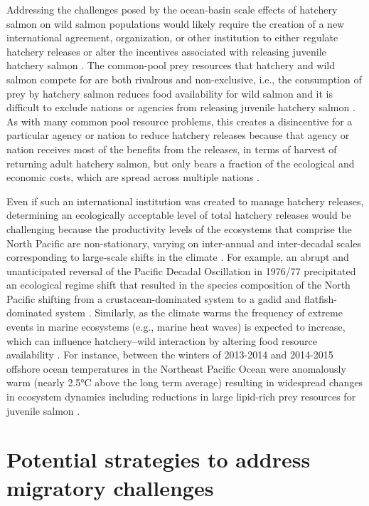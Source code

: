 Addressing the challenges posed by the ocean-basin scale effects of
hatchery salmon on wild salmon populations would likely require the
creation of a new international agreement, organization, or other
institution to either regulate hatchery releases or alter the incentives
associated with releasing juvenile hatchery salmon \citep{Holt2008b}.
The common-pool prey resources that hatchery and wild salmon compete for
are both rivalrous and non-exclusive, i.e., the consumption of prey by
hatchery salmon reduces food availability for wild salmon and it is
difficult to exclude nations or agencies from releasing juvenile
hatchery salmon \citep{Hardin1968a}. As with many common pool resource
problems, this creates a disincentive for a particular agency or nation
to reduce hatchery releases because that agency or nation receives most
of the benefits from the releases, in terms of harvest of returning
adult hatchery salmon, but only bears a fraction of the ecological and
economic costs, which are spread across multiple nations
\citep{Holt2008b}.

Even if such an international institution was created to manage hatchery
releases, determining an ecologically acceptable level of total hatchery
releases would be challenging because the productivity levels of the
ecosystems that comprise the North Pacific are non-stationary, varying
on inter-annual and inter-decadal scales corresponding to large-scale
shifts in the climate \citep{Hare1999a, Chavez2003a}. For example, an
abrupt and unanticipated reversal of the Pacific Decadal Oscillation in
1976/77 precipitated an ecological regime shift that resulted in the
species composition of the North Pacific shifting from a
crustacean-dominated system to a gadid and flatfish-dominated system
\citep{Mantua1997a, Anderson1999a, Mueter2000a}. Similarly, as the
climate warms the frequency of extreme events in marine ecosystems
(e.g., marine heat waves) is expected to increase, which can influence
hatchery--wild interaction by altering food resource availability
\citep{Jentsch2007, DiLorenzo2016}. For instance, between the winters of
2013-2014 and 2014-2015 offshore ocean temperatures in the Northeast
Pacific Ocean were anomalously warm (nearly 2.5°C above the long term
average) resulting in widespread changes in ecosystem dynamics including
reductions in large lipid-rich prey resources for juvenile salmon
\citep{Bond2015, DiLorenzo2016}.

\section{Potential strategies to address migratory challenges}

